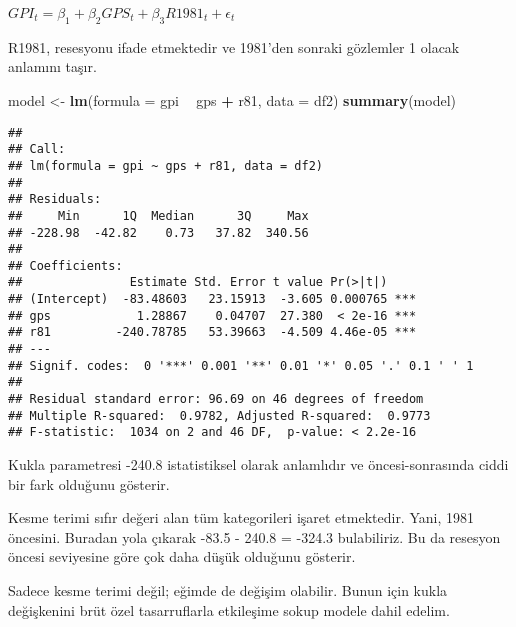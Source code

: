 \documentclass[
]{book}
\newenvironment{Shaded}{\begin{snugshade}}{\end{snugshade}}
\newcommand{\DataTypeTok}[1]{\textcolor[rgb]{0.13,0.29,0.53}{#1}}
\newcommand{\KeywordTok}[1]{\textcolor[rgb]{0.13,0.29,0.53}{\textbf{#1}}}
\newcommand{\NormalTok}[1]{#1}
\newcommand{\OperatorTok}[1]{\textcolor[rgb]{0.81,0.36,0.00}{\textbf{#1}}}
\newcommand{\StringTok}[1]{\textcolor[rgb]{0.31,0.60,0.02}{#1}}
\begin{document}
\(GPI_t = \beta_1 + \beta_2GPS_t + \beta_3R1981_t + \epsilon_t\)

R1981, resesyonu ifade etmektedir ve 1981'den sonraki gözlemler 1 olacak anlamını taşır.

\begin{Shaded}
\begin{Highlighting}[]
\NormalTok{model <-}\StringTok{ }\KeywordTok{lm}\NormalTok{(}\DataTypeTok{formula =}\NormalTok{ gpi }\OperatorTok{~}\StringTok{ }\NormalTok{gps }\OperatorTok{+}\StringTok{ }\NormalTok{r81, }\DataTypeTok{data =}\NormalTok{ df2)}
\KeywordTok{summary}\NormalTok{(model)}
\end{Highlighting}
\end{Shaded}

\begin{verbatim}
## 
## Call:
## lm(formula = gpi ~ gps + r81, data = df2)
## 
## Residuals:
##     Min      1Q  Median      3Q     Max 
## -228.98  -42.82    0.73   37.82  340.56 
## 
## Coefficients:
##               Estimate Std. Error t value Pr(>|t|)    
## (Intercept)  -83.48603   23.15913  -3.605 0.000765 ***
## gps            1.28867    0.04707  27.380  < 2e-16 ***
## r81         -240.78785   53.39663  -4.509 4.46e-05 ***
## ---
## Signif. codes:  0 '***' 0.001 '**' 0.01 '*' 0.05 '.' 0.1 ' ' 1
## 
## Residual standard error: 96.69 on 46 degrees of freedom
## Multiple R-squared:  0.9782, Adjusted R-squared:  0.9773 
## F-statistic:  1034 on 2 and 46 DF,  p-value: < 2.2e-16
\end{verbatim}

Kukla parametresi -240.8 istatistiksel olarak anlamlıdır ve öncesi-sonrasında ciddi bir fark olduğunu gösterir.

Kesme terimi sıfır değeri alan tüm kategorileri işaret etmektedir. Yani, 1981 öncesini. Buradan yola çıkarak -83.5 - 240.8 = -324.3 bulabiliriz. Bu da resesyon öncesi seviyesine göre çok daha düşük olduğunu gösterir.

Sadece kesme terimi değil; eğimde de değişim olabilir. Bunun için kukla değişkenini brüt özel tasarruflarla etkileşime sokup modele dahil edelim.

\begin{Shaded}
\end{Shaded}
\end{document}
